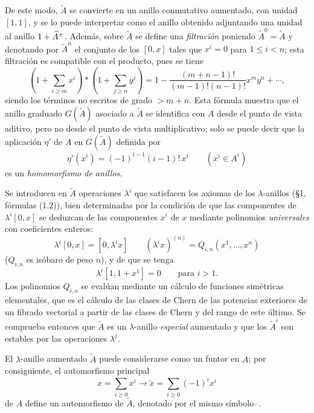 De este modo, $\widetilde A$ se convierte en un anillo conmutativo aumentado, con unidad $[1,1]$, y se lo puede interpretar como el anillo obtenido adjuntando una unidad al anillo $1+\widehat A^{+}$. Además, sobre $\widetilde A$ se define una \emph{filtración} poniendo $\widetilde A^0=\widetilde A$ y denotando por $\widetilde A^n$ el conjunto de los $[0,x]$ tales que $x^i=0$ para $1\leq i<n$; esta filtración es compatible con el producto, pues se tiene
\begin{equation}\tag{1.18}
\left(1+\sum_{i\geq m}x^i\right)*\left(1+\sum_{j\geq n}y^j\right)
=1-\frac{(m+n-1)!}{(m-1)!(n-1)!}x^m y^n+\cdots,
\end{equation}
siendo los términos no escritos de grado $>m+n$. Esta fórmula muestra que el anillo graduado $G(\widetilde A)$ asociado a $\widetilde A$ se identifica con $A$ desde el punto de vista aditivo, pero no desde el punto de vista multiplicativo; solo se puede decir que la aplicación $\eta'$ de $A$ en $G(\widetilde A)$ definida por
\begin{equation}\tag{1.19}
\eta'(x^i)=(-1)^{i-1}(i-1)!\,x^i\qquad (x^i\in A^i)
\end{equation}
es un \emph{homomorfismo de anillos}.

Se introducen en $\widetilde A$ operaciones $\lambda^i$ que satisfacen los axiomas de los $\lambda$-anillos (\S 1, fórmulas (1.2)), bien determinadas por la condición de que las componentes de $\lambda^i[0,x]$ se deduzcan de las componentes $x^i$ de $x$ mediante polinomios \emph{universales} con coeficientes enteros:
\begin{equation}\tag{1.20}
\lambda^i[0,x]=[0,\lambda^i x]\qquad (\lambda^i x)^{(n)}=Q_{i,n}(x^1,\ldots,x^n)
\end{equation}
($Q_{i,n}$ es isóbaro de peso $n$), y de que se tenga
\begin{equation}\tag{1.21}
\lambda^i[1,1+x^1]=0\qquad\text{para }i>1.
\end{equation}
Los polinomios $Q_{i,n}$ se evalúan mediante un cálculo de funciones simétricas elementales, que es el cálculo de las clases de Chern de las potencias exteriores de un fibrado vectorial a partir de las clases de Chern y del rango de este último. Se comprueba entonces que $\widetilde A$ es un $\lambda$-anillo \emph{especial} aumentado y que los $\widetilde A^i$ son estables por las operaciones $\lambda^j$.

El $\lambda$-anillo aumentado $\widetilde A$ puede considerarse como un funtor en $A$; por consiguiente, el automorfismo principal
\[
x=\sum_{i\geq0}x^i\longrightarrow \check x=\sum_{i\geq0}(-1)^i x^i
\]
de $A$ define un automorfismo de $\widetilde A$, denotado por el mismo símbolo $\check{\ }$.

